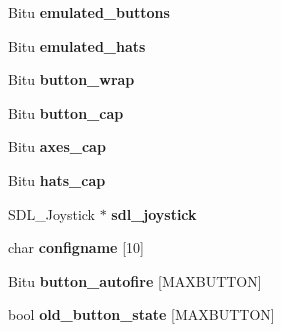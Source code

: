 \begin{DoxyCompactItemize}
\item 
\hypertarget{classCStickBindGroup_a51bea725a0cdafac1f0af7ce85241bea}{Bitu {\bfseries emulated\-\_\-buttons}}\label{classCStickBindGroup_a51bea725a0cdafac1f0af7ce85241bea}

\item 
\hypertarget{classCStickBindGroup_a0337c6069bcb3fd73597c33e33bf2451}{Bitu {\bfseries emulated\-\_\-hats}}\label{classCStickBindGroup_a0337c6069bcb3fd73597c33e33bf2451}

\item 
\hypertarget{classCStickBindGroup_a01f9966c343b6cc03a825dd7b6d3aa2f}{Bitu {\bfseries button\-\_\-wrap}}\label{classCStickBindGroup_a01f9966c343b6cc03a825dd7b6d3aa2f}

\item 
\hypertarget{classCStickBindGroup_afa2636c5e839bdfa507214390e88739a}{Bitu {\bfseries button\-\_\-cap}}\label{classCStickBindGroup_afa2636c5e839bdfa507214390e88739a}

\item 
\hypertarget{classCStickBindGroup_a902cd5277a0c67586acf999340852a8c}{Bitu {\bfseries axes\-\_\-cap}}\label{classCStickBindGroup_a902cd5277a0c67586acf999340852a8c}

\item 
\hypertarget{classCStickBindGroup_afc6609160872cd27fb78b984a28414ec}{Bitu {\bfseries hats\-\_\-cap}}\label{classCStickBindGroup_afc6609160872cd27fb78b984a28414ec}

\item 
\hypertarget{classCStickBindGroup_ab4a8851b19677cb8d894e0dfe99e60f9}{S\-D\-L\-\_\-\-Joystick $\ast$ {\bfseries sdl\-\_\-joystick}}\label{classCStickBindGroup_ab4a8851b19677cb8d894e0dfe99e60f9}

\item 
\hypertarget{classCStickBindGroup_ae12e74e64e04a46968d6f32469065ea9}{char {\bfseries configname} \mbox{[}10\mbox{]}}\label{classCStickBindGroup_ae12e74e64e04a46968d6f32469065ea9}

\item 
\hypertarget{classCStickBindGroup_a0389a0b42ba3f469fce030708ff507fc}{Bitu {\bfseries button\-\_\-autofire} \mbox{[}M\-A\-X\-B\-U\-T\-T\-O\-N\mbox{]}}\label{classCStickBindGroup_a0389a0b42ba3f469fce030708ff507fc}

\item 
\hypertarget{classCStickBindGroup_a96c43a605b492b037f18490fb75be8a1}{bool {\bfseries old\-\_\-button\-\_\-state} \mbox{[}M\-A\-X\-B\-U\-T\-T\-O\-N\mbox{]}}\label{classCStickBindGroup_a96c43a605b492b037f18490fb75be8a1}


\end{DoxyCompactItemize}
